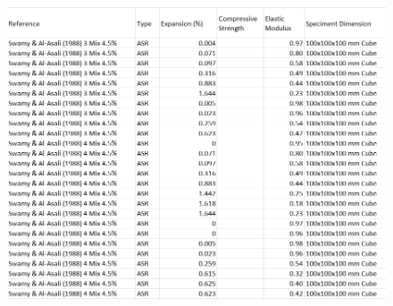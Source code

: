 \begin{figure}[h!]
  \centering
  \includegraphics[width=1.0\linewidth]{Reference/SwamyASRdata_2.png}
\end{figure}
